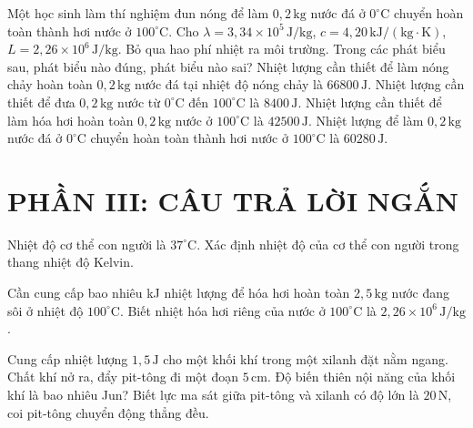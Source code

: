 \begin{ex}
	Một học sinh làm thí nghiệm đun nóng để làm $0{,}2\,\mathrm{kg}$ nước đá ở $0^\circ\mathrm{C}$ chuyển hoàn toàn thành hơi nước ở $100^\circ\mathrm{C}$. Cho $\lambda=3{,}34\times10^5\,\mathrm{J/kg}$, $c=4{,}20\,\mathrm{kJ/(kg\cdot K)}$, $L=2{,}26\times10^6\,\mathrm{J/kg}$. Bỏ qua hao phí nhiệt ra môi trường. Trong các phát biểu sau, phát biểu nào đúng, phát biểu nào sai?
	\choiceTF
	{\True Nhiệt lượng cần thiết để làm nóng chảy hoàn toàn $0{,}2\,\mathrm{kg}$ nước đá tại nhiệt độ nóng chảy là $66800\,\mathrm{J}$.}
	{Nhiệt lượng cần thiết để đưa $0{,}2\,\mathrm{kg}$ nước từ $0^\circ\mathrm{C}$ đến $100^\circ\mathrm{C}$ là $8400\,\mathrm{J}$.}
	{Nhiệt lượng cần thiết để làm hóa hơi hoàn toàn $0{,}2\,\mathrm{kg}$ nước ở $100^\circ\mathrm{C}$ là $42500\,\mathrm{J}$.}
	{Nhiệt lượng để làm $0{,}2\,\mathrm{kg}$ nước đá ở $0^\circ\mathrm{C}$ chuyển hoàn toàn thành hơi nước ở $100^\circ\mathrm{C}$ là $60280\,\mathrm{J}$.}
\end{ex}

\section*{PHẦN III: CÂU TRẢ LỜI NGẮN}

\begin{ex}
	Nhiệt độ cơ thể con người là $37^\circ\mathrm{C}$. Xác định nhiệt độ của cơ thể con người trong thang nhiệt độ Kelvin.
\end{ex}

\begin{ex}
	Cần cung cấp bao nhiêu kJ nhiệt lượng để hóa hơi hoàn toàn $2{,}5\,\mathrm{kg}$ nước đang sôi ở nhiệt độ $100^\circ\mathrm{C}$. Biết nhiệt hóa hơi riêng của nước ở $100^\circ\mathrm{C}$ là $2{,}26\times10^6\,\mathrm{J/kg}$.
\end{ex}

\begin{ex}
	Cung cấp nhiệt lượng $1{,}5\,\mathrm{J}$ cho một khối khí trong một xilanh đặt nằm ngang. Chất khí nở ra, đẩy pit-tông đi một đoạn $5\,\mathrm{cm}$. Độ biến thiên nội năng của khối khí là bao nhiêu Jun? Biết lực ma sát giữa pit-tông và xilanh có độ lớn là $20\,\mathrm{N}$, coi pit-tông chuyển động thẳng đều.
\end{ex}

